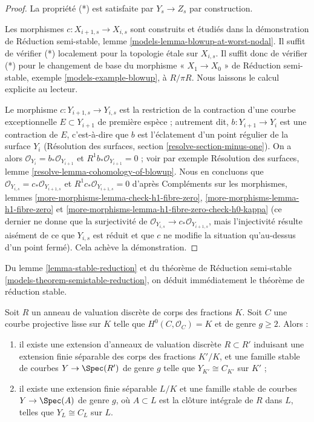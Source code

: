\begin{proof}
\medskip\noindent
La propriété (*) est satisfaite par $Y_s \to Z_s$ par construction.

\medskip\noindent
Les morphismes $c : X_{i + 1, s} \to X_{i, s}$ sont construits et étudiés
dans la démonstration de
Réduction semi-stable, lemme \ref{models-lemma-blowup-at-worst-nodal}.
Il suffit de vérifier (*) localement pour la topologie étale sur $X_{i, s}$.
Il suffit donc de vérifier (*) pour le changement de base du morphisme
« $X_1 \to X_0$ » de Réduction semi-stable, exemple \ref{models-example-blowup},
à $R/\pi R$.
Nous laissons le calcul explicite au lecteur.

\medskip\noindent
Le morphisme $c : Y_{i + 1, s} \to Y_{i, s}$ est la restriction
de la contraction d'une courbe exceptionnelle $E \subset Y_{i + 1}$
de première espèce ; autrement dit, $b : Y_{i + 1} \to Y_i$ est une contraction de $E$,
c'est-à-dire que $b$ est l'éclatement d'un point régulier de la surface $Y_i$
(Résolution des surfaces, section \ref{resolve-section-minus-one}).
On a alors $\mathcal{O}_{Y_i} = b_*\mathcal{O}_{Y_{i + 1}}$ et
$R^1b_*\mathcal{O}_{Y_{i + 1}} = 0$ ; voir par exemple
Résolution des surfaces, lemme
\ref{resolve-lemma-cohomology-of-blowup}.
Nous en concluons que $\mathcal{O}_{Y_{i, s}} = c_*\mathcal{O}_{Y_{i + 1, s}}$
et $R^1c_*\mathcal{O}_{Y_{i + 1, s}} = 0$ d'après
Compléments sur les morphismes, lemmes \ref{more-morphisms-lemma-check-h1-fibre-zero},
\ref{more-morphisms-lemma-h1-fibre-zero} et
\ref{more-morphisms-lemma-h1-fibre-zero-check-h0-kappa}
(ce dernier ne donne que la surjectivité de
$\mathcal{O}_{Y_{i, s}} \to c_*\mathcal{O}_{Y_{i + 1, s}}$, mais
l'injectivité résulte aisément de ce que $Y_{i, s}$ est réduit
et que $c$ ne modifie la situation qu'au-dessus d'un point fermé).
Cela achève la démonstration.
\end{proof}

\noindent
Du lemme \ref{lemma-stable-reduction} et du
théorème de Réduction semi-stable \ref{models-theorem-semistable-reduction},
on déduit immédiatement le théorème de réduction stable.

\begin{theorem}
\label{theorem-stable-reduction}
\begin{reference}
\cite[corollaire 2.7]{DM}
\end{reference}
Soit $R$ un anneau de valuation discrète de corps des fractions $K$. Soit $C$ une
courbe projective lisse sur $K$ telle que $H^0(C, \mathcal{O}_C) = K$
et de genre $g \geq 2$. Alors :
\begin{enumerate}
\item il existe une extension d'anneaux de valuation discrète $R \subset R'$
induisant une extension finie séparable des corps des fractions $K'/K$, et
une famille stable de courbes $Y \to \Spec(R')$ de genre $g$ telle que
$Y_{K'} \cong C_{K'}$ sur $K'$ ;
\item il existe une extension finie séparable $L/K$ et une famille stable
de courbes $Y \to \Spec(A)$ de genre $g$, où $A \subset L$
est la clôture intégrale de $R$ dans $L$, telles que
$Y_L \cong C_L$ sur $L$.
\end{enumerate}
\end{theorem}

